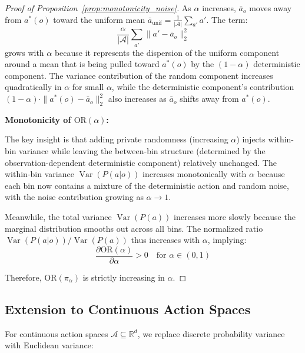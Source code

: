 \documentclass[twoside]{article}
\DeclareMathOperator{\Var}{Var}
\theoremstyle{remark}
\begin{document}
\begin{proof}[Proof of Proposition~\ref{prop:monotonicity_noise}]
As $\alpha$ increases, $\bar{a}_o$ moves away from $a^*(o)$ toward the uniform mean $\bar{a}_{\text{unif}} = \frac{1}{|\mathcal{A}|}\sum_{a'} a'$. The term:
\begin{equation}
\frac{\alpha}{|\mathcal{A}|} \sum_{a'} \|a' - \bar{a}_o\|_2^2
\end{equation}
grows with $\alpha$ because it represents the dispersion of the uniform component around a mean that is being pulled toward $a^*(o)$ by the $(1-\alpha)$ deterministic component. The variance contribution of the random component increases quadratically in $\alpha$ for small $\alpha$, while the deterministic component's contribution $(1-\alpha) \cdot \|a^*(o) - \bar{a}_o\|_2^2$ also increases as $\bar{a}_o$ shifts away from $a^*(o)$.

\textbf{Monotonicity of $\mathrm{OR}(\alpha)$:}

The key insight is that adding private randomness (increasing $\alpha$) injects within-bin variance while leaving the between-bin structure (determined by the observation-dependent deterministic component) relatively unchanged. The within-bin variance $\Var(P(a|o))$ increases monotonically with $\alpha$ because each bin now contains a mixture of the deterministic action and random noise, with the noise contribution growing as $\alpha \to 1$.

Meanwhile, the total variance $\Var(P(a))$ increases more slowly because the marginal distribution smooths out across all bins. The normalized ratio $\Var(P(a|o)) / \Var(P(a))$ thus increases with $\alpha$, implying:
\begin{equation}
\frac{\partial \mathrm{OR}(\alpha)}{\partial \alpha} > 0 \quad \text{for } \alpha \in (0, 1)
\end{equation}

Therefore, $\mathrm{OR}(\pi_\alpha)$ is strictly increasing in $\alpha$.
\end{proof}

\subsection{Extension to Continuous Action Spaces}
\label{app:continuous_or}

For continuous action spaces $\mathcal{A} \subseteq \mathbb{R}^d$, we replace discrete probability variance with Euclidean variance:
\end{document}
